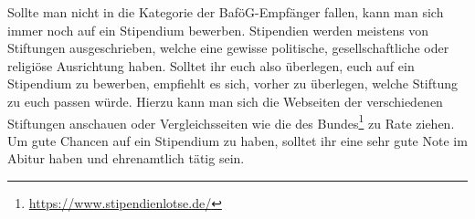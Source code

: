 Sollte man nicht in die Kategorie der BaföG-Empfänger fallen, kann man sich immer noch auf ein Stipendium bewerben. Stipendien werden meistens von Stiftungen ausgeschrieben, welche eine gewisse politische, gesellschaftliche oder religiöse Ausrichtung haben. Solltet ihr euch also überlegen, euch auf ein Stipendium zu bewerben, empfiehlt es sich, vorher zu überlegen, welche Stiftung zu euch passen würde. Hierzu kann man sich die Webseiten der verschiedenen Stiftungen anschauen oder Vergleichsseiten wie die des Bundes\footnote{\url{https://www.stipendienlotse.de/}} zu Rate ziehen. \medskip \\	%
Um gute Chancen auf ein Stipendium zu haben, solltet ihr eine sehr gute Note im Abitur haben und ehrenamtlich tätig sein.